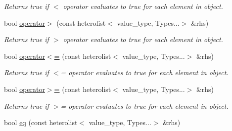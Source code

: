 \begin{DoxyCompactItemize}
\begin{DoxyCompactList}\small\item\em Returns true if $<$ operator evaluates to true for each element in object. \end{DoxyCompactList}\item 
\hypertarget{classheterogeneous_1_1heterolist_3_01_t_00_01_types_8_8_8_4_a30d9e7856fad452c38e4842e39913c7c}{}bool \hyperlink{classheterogeneous_1_1heterolist_3_01_t_00_01_types_8_8_8_4_a30d9e7856fad452c38e4842e39913c7c}{operator$>$} (const heterolist$<$ value\+\_\+type, Types...$>$ \&rhs)\label{classheterogeneous_1_1heterolist_3_01_t_00_01_types_8_8_8_4_a30d9e7856fad452c38e4842e39913c7c}

\begin{DoxyCompactList}\small\item\em Returns true if $>$ operator evaluates to true for each element in object. \end{DoxyCompactList}\item 
\hypertarget{classheterogeneous_1_1heterolist_3_01_t_00_01_types_8_8_8_4_a204c33c94abb6900c42084f3c59e170b}{}bool \hyperlink{classheterogeneous_1_1heterolist_3_01_t_00_01_types_8_8_8_4_a204c33c94abb6900c42084f3c59e170b}{operator$<$=} (const heterolist$<$ value\+\_\+type, Types...$>$ \&rhs)\label{classheterogeneous_1_1heterolist_3_01_t_00_01_types_8_8_8_4_a204c33c94abb6900c42084f3c59e170b}

\begin{DoxyCompactList}\small\item\em Returns true if $<$= operator evaluates to true for each element in object. \end{DoxyCompactList}\item 
\hypertarget{classheterogeneous_1_1heterolist_3_01_t_00_01_types_8_8_8_4_a35f9216ddf8f6be30a27edfc456ee4a6}{}bool \hyperlink{classheterogeneous_1_1heterolist_3_01_t_00_01_types_8_8_8_4_a35f9216ddf8f6be30a27edfc456ee4a6}{operator$>$=} (const heterolist$<$ value\+\_\+type, Types...$>$ \&rhs)\label{classheterogeneous_1_1heterolist_3_01_t_00_01_types_8_8_8_4_a35f9216ddf8f6be30a27edfc456ee4a6}

\begin{DoxyCompactList}\small\item\em Returns true if $>$= operator evaluates to true for each element in object. \end{DoxyCompactList}\item 
\hypertarget{classheterogeneous_1_1heterolist_3_01_t_00_01_types_8_8_8_4_a6d021951422e09a4359aee0bf3f34c93}{}bool \hyperlink{classheterogeneous_1_1heterolist_3_01_t_00_01_types_8_8_8_4_a6d021951422e09a4359aee0bf3f34c93}{eq} (const heterolist$<$ value\+\_\+type, Types...$>$ \&rhs)\label{classheterogeneous_1_1heterolist_3_01_t_00_01_types_8_8_8_4_a6d021951422e09a4359aee0bf3f34c93}


\end{DoxyCompactItemize}
